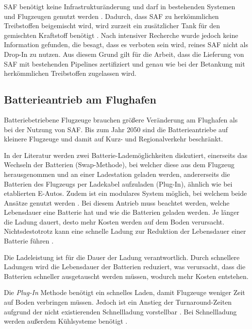 SAF benötigt keine Infrastrukturänderung und darf in bestehenden Systemen 
und Flugzeugen genutzt werden \cite{dalmia2022powering}.
Dadurch, dass SAF zu herkömmlichen Treibstoffen beigemischt wird, 
wird zurzeit ein zusätzlicher Tank für den gemischten Kraftstoff benötigt \cite{moriarty2024sustainable}. 
Nach intensiver Recherche wurde jedoch keine Information gefunden, 
die besagt, dass es verboten sein wird, reines SAF nicht als Drop-In zu nutzen.
Aus diesem Grund gilt für die Arbeit, dass die Lieferung von SAF mit bestehenden Pipelines 
zertifiziert und genau wie bei der Betankung mit herkömmlichen Treibstoffen zugelassen wird.

\subsection{Batterieantrieb am Flughafen}
Batteriebetriebene Flugzeuge brauchen größere Veränderung am 
Flughafen als bei der Nutzung von SAF.
Bis zum Jahr 2050 sind die Batterieantriebe auf kleinere Flugzeuge 
und damit auf Kurz- und Regionalverkehr beschränkt. 

In der Literatur werden zwei Batterie-Lademöglichkeiten diskutiert, 
einerseits das Wechseln der Batterien (Swap-Methode), 
bei welcher diese aus dem Flugzeug herausgenommen und an einer Ladestation geladen werden, 
andererseits die Batterien des Flugzeugs per Ladekabel aufzuladen (Plug-In), 
ähnlich wie bei etablierten E-Autos.
Zudem ist ein modulares System möglich, bei welchem beide Ansätze genutzt werden \cite{salucci2020optimal}.
%
Bei diesem Antrieb muss beachtet werden, 
welche Lebensdauer eine Batterie hat und wie die Batterien geladen werden. 
Je länger die Ladung dauert, desto mehr Kosten werden auf dem Boden verursacht. 
Nichtsdestotrotz kann eine schnelle Ladung zur Reduktion der Lebensdauer einer Batterie führen \cite{shirk2015effects}.

Die Ladeleistung ist für die Dauer der Ladung verantwortlich. 
Durch schnellere Ladungen wird die Lebensdauer der Batterien reduziert,
was verursacht, dass die Batterien schneller ausgetauscht werden 
müssen, wodurch mehr Kosten entstehen.

%
Die \textit{Plug-In} Methode benötigt ein schnelles Laden, 
damit Flugzeuge weniger Zeit auf Boden verbringen müssen.
Jedoch ist ein Anstieg der Turnaround-Zeiten aufgrund der 
nicht existierenden Schnellladung vorstellbar \cite{avogadro2024demystifying}. %
Bei Schnellladung werden außerdem Kühlsysteme benötigt \cite{reimers2018introduction}.

